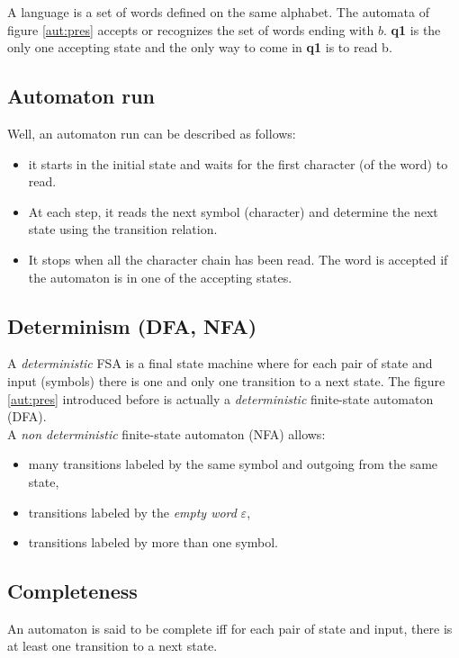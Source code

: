 \noindent A language is a set of words defined on the same alphabet. The automata of figure \ref{aut:pres}
accepts or recognizes the set of words ending with $b$. \textbf{q1} is the only one accepting state and
the only way to come in \textbf{q1} is to read b.

\subsection{Automaton run}
Well, an automaton run can be described as follows:
\begin{itemize}
 \item it starts in the initial state and waits for the first character (of the word) to read.
 \item At each step, it reads the next symbol (character) and determine the next state using the
       transition relation.
 \item It stops when all the character chain has been read. The word is accepted if the automaton is
       in one of the accepting states.
\end{itemize}

\subsection{Determinism (DFA, NFA)}
A \textit{deterministic} FSA is a final state machine where for each pair of state and input (symbols)
there is one and only one transition to a next state. The figure \ref{aut:pres} introduced before is
actually a \textit{deterministic} finite-state automaton (DFA).\\

\noindent A \textit{non deterministic} finite-state automaton (NFA) allows:
\begin{itemize}
 \item many transitions labeled by the same symbol and outgoing from the same state,
 \item transitions labeled by the \textit{empty word} $\varepsilon$,
 \item transitions labeled by more than one symbol.
\end{itemize}

\subsection{Completeness}
An automaton is said to be complete iff for each pair of state and input, there is at least one transition
to a next state.


